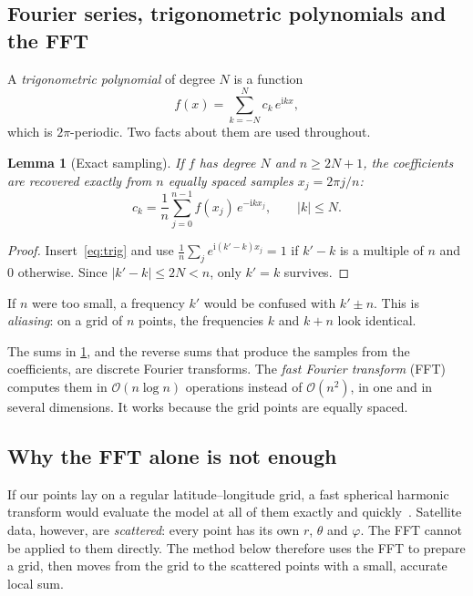 \documentclass[11pt,a4paper]{article}
\newtheorem{lemma}{Lemma}
\theoremstyle{definition}
\newcommand{\Oh}{\mathcal{O}}
\newcommand{\ii}{\mathrm{i}}
\begin{document}
\subsection{Fourier series, trigonometric polynomials and the FFT}\label{sec:fourier}
A \emph{trigonometric polynomial} of degree $N$ is a function
\begin{equation}\label{eq:trig}
f(x)=\sum_{k=-N}^{N}c_k\,e^{\ii kx},
\end{equation}
which is $2\pi$-periodic. Two facts about them are used throughout.
\begin{lemma}[Exact sampling]\label{lem:sampling}
If $f$ has degree $N$ and $n\ge2N+1$, the coefficients are recovered exactly from $n$ equally spaced samples $x_j=2\pi j/n$:
\begin{equation}
c_k=\frac1n\sum_{j=0}^{n-1}f(x_j)\,e^{-\ii kx_j},\qquad |k|\le N.
\end{equation}
\end{lemma}
\begin{proof}
Insert~\eqref{eq:trig} and use $\frac1n\sum_{j}e^{\ii(k'-k)x_j}=1$ if $k'-k$ is a multiple of $n$ and $0$ otherwise. Since $|k'-k|\le2N<n$,
only $k'=k$ survives.
\end{proof}
If $n$ were too small, a frequency $k'$ would be confused with $k'\pm n$. This is \emph{aliasing}: on a grid of $n$
points, the frequencies $k$ and $k+n$ look identical.

The sums in \cref{lem:sampling}, and the reverse sums that produce the samples from the coefficients, are discrete
Fourier transforms. The \emph{fast Fourier transform} (FFT)~\cite{cooley1965} computes them in $\Oh(n\log n)$ operations
instead of $\Oh(n^2)$, in one and in several dimensions. It works because the grid points are equally spaced.

\subsection{Why the FFT alone is not enough}
If our points lay on a regular latitude--longitude grid, a fast spherical harmonic transform would evaluate the
model at all of them exactly and quickly~\cite{schaeffer2013,driscoll1994}. Satellite data, however, are
\emph{scattered}: every point has its own $r$, $\theta$ and $\varphi$. The FFT cannot be applied to them directly.
The method below therefore uses the FFT to prepare a grid, then moves from the grid to the scattered points with a
small, accurate local sum.

\end{document}
